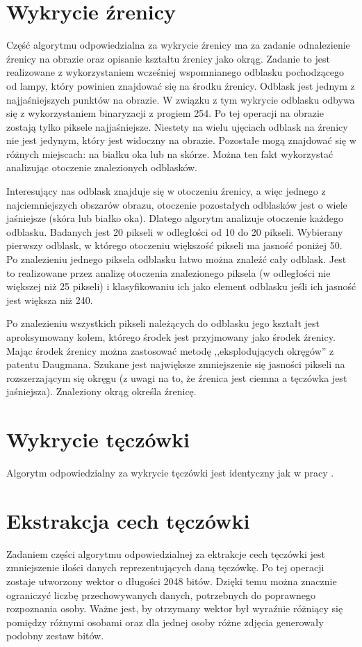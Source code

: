 \section{Wykrycie źrenicy}
\label{sec:wykrycieZrenicy}
Część algorytmu odpowiedzialna za wykrycie źrenicy ma za zadanie odnalezienie źrenicy na obrazie oraz opisanie kształtu źrenicy jako okrąg. Zadanie to jest realizowane z wykorzystaniem wcześniej wspomnianego odblasku pochodzącego od lampy, który powinien znajdować się na środku źrenicy. Odblask jest jednym z najjaśniejszych punktów na obrazie. W związku z tym wykrycie odblasku odbywa się z wykorzystaniem binaryzacji z progiem 254. Po tej operacji na obrazie zostają tylko piksele najjaśniejsze. Niestety na wielu ujęciach odblask na źrenicy nie jest jedynym, który jest widoczny na obrazie. Pozostałe mogą znajdować się w różnych miejscach: na białku oka lub na skórze. Można ten fakt wykorzystać analizując otoczenie znalezionych odblasków. 

Interesujący nas odblask znajduje się w otoczeniu źrenicy, a więc jednego z najciemniejszych obszarów obrazu, otoczenie pozostałych odblasków jest o wiele jaśniejsze (skóra lub białko oka). Dlatego algorytm analizuje otoczenie każdego odblasku. Badanych jest 20 pikseli w odległości od 10 do 20 pikseli. Wybierany pierwszy odblask, w którego otoczeniu większość pikseli ma jasność poniżej 50. Po znalezieniu jednego piksela odblasku łatwo można znaleźć cały odblask. Jest to realizowane przez analizę otoczenia znalezionego piksela (w odległości nie większej niż 25 pikseli) i klasyfikowaniu ich jako element odblasku jeśli ich jasność jest większa niż 240.

Po znalezieniu wszystkich pikseli należących do odblasku jego kształt jest aproksymowany kołem, którego środek jest przyjmowany jako środek źrenicy. Mając środek źrenicy można zastosować metodę ,,eksplodujących okręgów'' z patentu Daugmana. Szukane jest największe zmniejszenie się jasności pikseli na rozszerzającym się okręgu (z uwagi na to, że źrenica jest ciemna a tęczówka jest jaśniejsza). Znaleziony okrąg określa źrenicę.

\section{Wykrycie tęczówki}
\label{sec:wykrycieTeczowki}
Algorytm odpowiedzialny za wykrycie tęczówki jest identyczny jak w pracy \cite{Gl11}.

\section{Ekstrakcja cech tęczówki}
\label{sec:ekstrakcja}
Zadaniem części algorytmu odpowiedzialnej za ektrakcje cech tęczówki jest zmniejszenie ilości danych reprezentujących daną tęczówkę. Po tej operacji zostaje utworzony wektor o długości 2048 bitów. Dzięki temu można znacznie ograniczyć liczbę przechowywanych danych, potrzebnych do poprawnego rozpoznania osoby. Ważne jest, by otrzymany wektor był wyraźnie różniący się pomiędzy różnymi osobami oraz dla jednej osoby różne zdjęcia generowały podobny zestaw bitów. 

